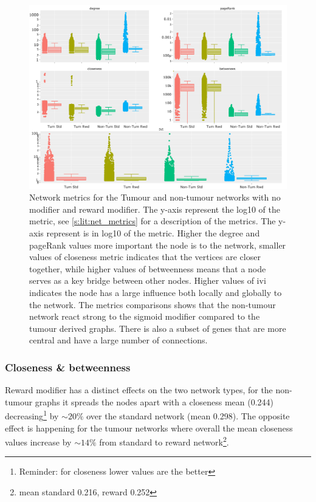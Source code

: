 \begin{figure}[!htb]    
    \centering
    \includegraphics[width=1.0\textwidth,keepaspectratio]{Sections/Network_II/validation/network_comparison.png}
    \caption[Network metrics for cancerous and non-tumour graphs]{Network metrics for the Tumour and non-tumour networks with no modifier and reward modifier. The y-axis represent the log10 of the metric, see \cref{s:lit:net_metrics} for a description of the metrics. The y-axis represent is in log10 of the metric. Higher the degree and pageRank values more important the node is to the network, smaller values of closeness metric indicates that the vertices are closer together, while higher values of betweenness means that a node serves as a key bridge between other nodes. Higher values of \acrlong{ivi} indicates the node has a large influence both locally and globally to the network. The metrics comparisons shows that the non-tumour network react strong to the sigmoid modifier compared to the tumour derived graphs. There is also a subset of genes that are more central and have a large number of connections.}
    \label{fig:N_II:net_metrics_comp}
\end{figure}


\subsubsection*{Closeness \& betweenness}

Reward modifier has a distinct effects on the two network types, for the non-tumour graphs it spreads the nodes apart with a closeness mean (0.244) decreasing\footnote{Reminder: for closeness lower values are the better} by $\sim20\%$ over the standard network (mean 0.298). The opposite effect is happening for the tumour networks where overall the mean closeness values increase by $\sim14\%$ from standard to reward network\footnote{mean standard 0.216, reward 0.252}.

